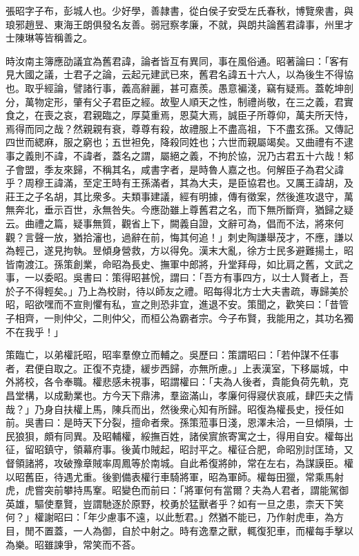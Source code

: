 
\begin{pinyinscope}
張昭字子布，彭城人也。少好學，善隷書，從白侯子安受左氏春秋，博覽衆書，與琅邪趙昱、東海王朗俱發名友善。弱冠察孝廉，不就，與朗共論舊君諱事，州里才士陳琳等皆稱善之。

時汝南主簿應劭議宜為舊君諱，論者皆互有異同，事在風俗通。昭著論曰：「客有見大國之議，士君子之論，云起元建武已來，舊君名諱五十六人，以為後生不得協也。取乎經論，譬諸行事，義高辭麗，甚可嘉羨。愚意褊淺，竊有疑焉。蓋乾坤剖分，萬物定形，肇有父子君臣之經。故聖人順天之性，制禮尚敬，在三之義，君實食之，在喪之哀，君親臨之，厚莫重焉，恩莫大焉，誠臣子所尊仰，萬夫所天恃，焉得而同之哉？然親親有衰，尊尊有殺，故禮服上不盡高祖，下不盡玄孫。又傳記四世而緦麻，服之窮也；五世袒免，降殺同姓也；六世而親屬竭矣。又曲禮有不逮事之義則不諱，不諱者，蓋名之謂，屬絕之義，不拘於協，況乃古君五十六哉！邾子會盟，季友來歸，不稱其名，咸書字者，是時魯人嘉之也。何解臣子為君父諱乎？周穆王諱滿，至定王時有王孫滿者，其為大夫，是臣協君也。又厲王諱胡，及莊王之子名胡，其比衆多。夫類事建議，經有明據，傳有徵案，然後進攻退守，萬無奔北，垂示百世，永無咎失。今應劭雖上尊舊君之名，而下無所斷齊，猶歸之疑云。曲禮之篇，疑事無質，觀省上下，闕義自證，文辭可為，倡而不法，將來何觀？言聲一放，猶拾瀋也，過辭在前，悔其何追！」刺史陶謙舉茂才，不應，謙以為輕己，遂見拘執。昱傾身營救，方以得免。漢末大亂，徐方士民多避難揚土，昭皆南渡江。孫策創業，命昭為長史、撫軍中郎將，升堂拜母，如比肩之舊，文武之事，一以委昭。吳書曰：策得昭甚恱，謂曰：「吾方有事四方，以士人賢者上，吾於子不得輕矣。」乃上為校尉，待以師友之禮。昭每得北方士大夫書疏，專歸美於昭，昭欲嘿而不宣則懼有私，宣之則恐非宜，進退不安。策聞之，歡笑曰：「昔管子相齊，一則仲父，二則仲父，而桓公為霸者宗。今子布賢，我能用之，其功名獨不在我乎！」

策臨亡，以弟權託昭，昭率羣僚立而輔之。吳歷曰：策謂昭曰：「若仲謀不任事者，君便自取之。正復不克捷，緩步西歸，亦無所慮。」上表漢室，下移屬城，中外將校，各令奉職。權悲感未視事，昭謂權曰：「夫為人後者，貴能負荷先軌，克昌堂構，以成勳業也。方今天下鼎沸，羣盜滿山，孝廉何得寢伏哀戚，肆匹夫之情哉？」乃身自扶權上馬，陳兵而出，然後衆心知有所歸。昭復為權長史，授任如前。吳書曰：是時天下分裂，擅命者衆。孫策蒞事日淺，恩澤未洽，一旦傾隕，士民狼狽，頗有同異。及昭輔權，綏撫百姓，諸侯賔旅寄寓之士，得用自安。權每出征，留昭鎮守，領幕府事。後黃巾賊起，昭討平之。權征合肥，命昭別討匡琦，又督領諸將，攻破豫章賊率周鳳等於南城。自此希復將帥，常在左右，為謀謨臣。權以昭舊臣，待遇尤重。後劉備表權行車騎將軍，昭為軍師。權每田獵，常乘馬射虎，虎嘗突前攀持馬鞌。昭變色而前曰：「將軍何有當爾？夫為人君者，謂能駕御英雄，驅使羣賢，豈謂馳逐於原野，校勇於猛獸者乎？如有一旦之患，柰天下笑何？」權謝昭曰：「年少慮事不遠，以此慙君。」然猶不能已，乃作射虎車，為方目，閒不置蓋，一人為御，自於中射之。時有逸羣之獸，輒復犯車，而權每手擊以為樂。昭雖諫爭，常笑而不荅。


\end{pinyinscope}

